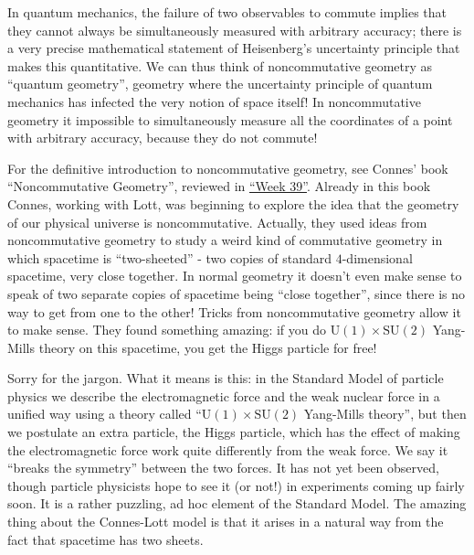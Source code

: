 \documentclass{article}
\begin{document}
In quantum mechanics, the failure of two observables to commute implies
that they cannot always be simultaneously measured with arbitrary
accuracy; there is a very precise mathematical statement of Heisenberg's
uncertainty principle that makes this quantitative. We can thus think of
noncommutative geometry as ``quantum geometry'', geometry where the
uncertainty principle of quantum mechanics has infected the very notion
of space itself! In noncommutative geometry it impossible to
simultaneously measure all the coordinates of a point with arbitrary
accuracy, because they do not commute!

For the definitive introduction to noncommutative geometry, see Connes'
book ``Noncommutative Geometry'', reviewed in
\protect\hyperlink{week39}{``Week 39''}. Already in this book Connes,
working with Lott, was beginning to explore the idea that the geometry
of our physical universe is noncommutative. Actually, they used ideas
from noncommutative geometry to study a weird kind of commutative
geometry in which spacetime is ``two-sheeted'' - two copies of standard
\(4\)-dimensional spacetime, very close together. In normal geometry it
doesn't even make sense to speak of two separate copies of spacetime
being ``close together'', since there is no way to get from one to the
other! Tricks from noncommutative geometry allow it to make sense. They
found something amazing: if you do
\(\mathrm{U}(1)\times \mathrm{SU}(2)\) Yang-Mills theory on this
spacetime, you get the Higgs particle for free!

Sorry for the jargon. What it means is this: in the Standard Model of
particle physics we describe the electromagnetic force and the weak
nuclear force in a unified way using a theory called
``\(\mathrm{U}(1)\times \mathrm{SU}(2)\) Yang-Mills theory'', but then
we postulate an extra particle, the Higgs particle, which has the effect
of making the electromagnetic force work quite differently from the weak
force. We say it ``breaks the symmetry'' between the two forces. It has
not yet been observed, though particle physicists hope to see it (or
not!) in experiments coming up fairly soon. It is a rather puzzling, ad
hoc element of the Standard Model. The amazing thing about the
Connes-Lott model is that it arises in a natural way from the fact that
spacetime has two sheets.
\end{document}
